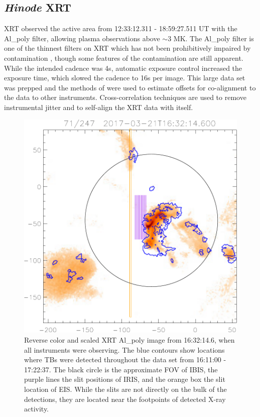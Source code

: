 \documentclass[twocolumn]{aastex62}
\begin{document}
\subsection{{\it Hinode} XRT}
XRT observed the active area from 12:33:12.311 -  18:59:27.511 UT with the Al\_poly filter, allowing plasma observations above $\sim$3 MK. The Al\_poly filter is one of the thinnest filters on XRT which has not been prohibitively impaired by contamination \citep[][]{2011NarukageEA_XRT3}, though some features of the contamination are still apparent. While the intended cadence was 4s, automatic exposure control increased the exposure time, which slowed the cadence to 16s per image. This large data set was prepped \citep[][]{2014KobelskiEA_xrtprep} and the methods of \citet{2015YoshimuraMcKenzie_XRTcoalign} were used to estimate offsets for co-alignment to the data to other instruments. Cross-correlation techniques \citep[such as {\tt tr\_get\_disp.pro} in SolarSoft;][]{1998FreelandHandy_SSW} are used to remove instrumental jitter and to self-align the XRT data with itself.
\begin{figure}[b]
\centering
\includegraphics[width=0.9\linewidth]{figures/img0070}
\caption{Reverse color and scaled XRT Al\_poly image from 16:32:14.6, when all instruments were observing. The blue contours show locations where TBs were detected throughout the data set from 16:11:00 - 17:22:37. The black circle is the approximate FOV of IBIS, the purple lines the slit positions of IRIS, and the orange box the slit location of EIS. While the slits are not directly on the bulk of the detections, they are located near the footpoints of detected X-ray activity.}\label{fig:xrt}
\end{figure}
\end{document}
